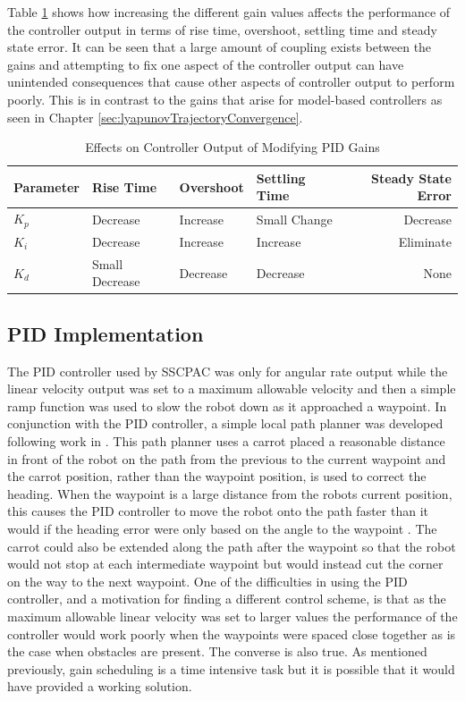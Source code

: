 Table \ref{tab:PIDGainEffects} shows how increasing the different gain values affects the performance of the controller output in terms of rise time, overshoot, settling time and steady state error. It can be seen that a large amount of coupling exists between the gains and attempting to fix one aspect of the controller output can have unintended consequences that cause other aspects of controller output to perform poorly. This is in contrast to the gains that arise for model-based controllers as seen in Chapter \ref{sec:lyapunovTrajectoryConvergence}.

\begin{table}[ht!]
\caption{Effects on Controller Output of Modifying PID Gains}
\small
\centering
\begin{tabular}{@{}llllr@{}} \toprule
Parameter    & Rise Time      & Overshoot & Settling Time & Steady State Error \\ \midrule
$K_p$        & Decrease       & Increase  & Small Change  & Decrease \\
$K_i$        & Decrease       & Increase  & Increase      & Eliminate \\
$K_d$        & Small Decrease & Decrease  & Decrease      & None \\ \bottomrule
\end{tabular}
\label{tab:PIDGainEffects}
\end{table}

\subsection{PID Implementation}
The PID controller used by SSCPAC was only for angular rate output while the linear velocity output was set to a maximum allowable velocity and then a simple ramp function was used to slow the robot down as it approached a waypoint. In conjunction with the PID controller, a simple local path planner was developed following work in \cite{Hogg02}. This path planner uses a carrot placed a reasonable distance in front of the robot on the path from the previous to the current waypoint and the carrot position, rather than the waypoint position, is used to correct the heading. When the waypoint is a large distance from the robots current position, this causes the PID controller to move the robot onto the path faster than it would if the heading error were only based on the angle to the waypoint . The carrot could also be extended along the path after the waypoint so that the robot would not stop at each intermediate waypoint but would instead cut the corner on the way to the next waypoint. One of the difficulties in using the PID controller, and a motivation for finding a different control scheme, is that as the maximum allowable linear velocity was set to larger values the performance of the controller would work poorly when the waypoints were spaced close together as is the case when obstacles are present. The converse is also true. As mentioned previously, gain scheduling is a time intensive task but it is possible that it would have provided a working solution.

